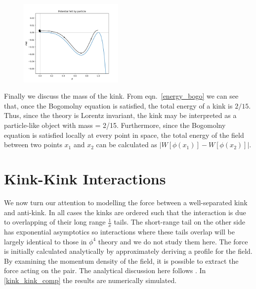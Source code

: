 \documentclass[11pt, oneside,titlepage]{article}  	%
\numberwithin{equation}{section}
\begin{document}
 \begin{figure}
 \vspace{-10pt}
\centering
 \includegraphics[width=0.45\textwidth]{mech_kink.png}
  \label{mech}
 \vspace{-23pt}
\end{figure} 
 Finally we discuss the mass of the kink. From eqn.~\ref{energy_bogo} we can see that, once the Bogomolny equation is satisfied, the total energy of a kink is $2/15$. Thus, since the theory is Lorentz invariant, the kink may be interpreted as a particle-like object with mass = 2/15. Furthermore, since the Bogomolny equation is satisfied locally at every point in space, the total energy of the field between two points $x_1$ and $x_2$ can be calculated as $\left | W\left [ \phi(x_1)\right ] - W\left [ \phi(x_2)\right ]\right |$.
 
 \section{Kink-Kink Interactions}
 We now turn our attention to modelling the force between a well-separated kink and anti-kink. In all cases the kinks are ordered such that the interaction is due to overlapping of their long range $\frac{1}{x}$ tails. The short-range tail on the other side has exponential asymptotics so interactions where these tails overlap will be largely identical to those in $\phi^4$ theory and we do not study them here. The force is initially calculated analytically by approximately deriving a profile for the field. By examining the momentum density of the field, it is possible to extract the force acting on the pair. The analytical discussion here follows \cite{manton-paper}. In \textsection \ref{kink_kink_comp} the results are numerically simulated.\par
\end{document}
